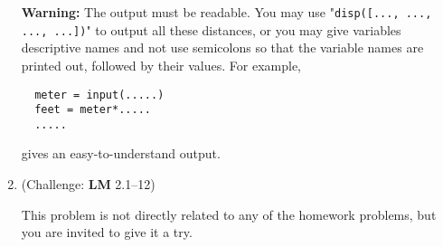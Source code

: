 \documentclass[11pt]{article}
\begin{document}
\begin{enumerate}
\textbf{Warning:} The output must be readable. You may use "\texttt{disp([..., ..., ..., ...])}" to output all these distances, or you may give variables descriptive names and not use semicolons so that the variable names are printed out, followed by their values. For example,
\begin{verbatim}
  meter = input(.....)
  feet = meter*.....
  .....
\end{verbatim}
gives an easy-to-understand output.

\item (Challenge: \textbf{LM} 2.1--12)
\label{sec:org12950aa}

This problem is not directly related to any of the homework problems, but you are invited to give it a try.
\end{enumerate}
\end{document}
